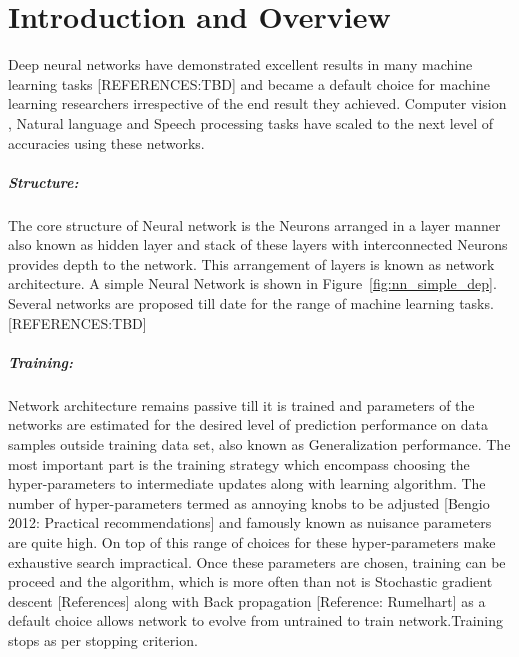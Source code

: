 
\chapter{Introduction and Overview}\label{chap:intro}
\noindent Deep neural networks have demonstrated excellent results in many machine learning tasks [REFERENCES:TBD] and became a default choice for machine learning researchers irrespective of the end result they achieved.
Computer vision , Natural language and Speech processing tasks have scaled to the next level of accuracies using these networks.
\paragraph{Structure:} The core structure of Neural network is the Neurons arranged in a layer manner also known as hidden layer and stack of these layers with interconnected Neurons provides depth to the network. This arrangement of layers is known as network architecture. A simple Neural Network is shown in Figure~\ref{fig:nn_simple_dep}.
Several networks are proposed till date for the range of machine learning tasks.[REFERENCES:TBD]
\paragraph{Training:} Network architecture remains passive till it is trained and parameters of the networks are estimated for the desired level of prediction performance on data samples outside training data set, also known as Generalization performance.
The most important part is the training strategy which encompass choosing the hyper-parameters to intermediate updates along with learning algorithm.
The number of hyper-parameters termed as annoying knobs to be adjusted [Bengio 2012: Practical recommendations] and famously known as nuisance parameters are quite high. On top of this range of choices for these hyper-parameters make exhaustive search impractical.
Once these parameters are chosen, training can be proceed and the algorithm, which is more often than not is Stochastic gradient descent [References] along with Back propagation [Reference: Rumelhart] as a default choice allows network to evolve from untrained to train network.Training stops as per stopping criterion.

